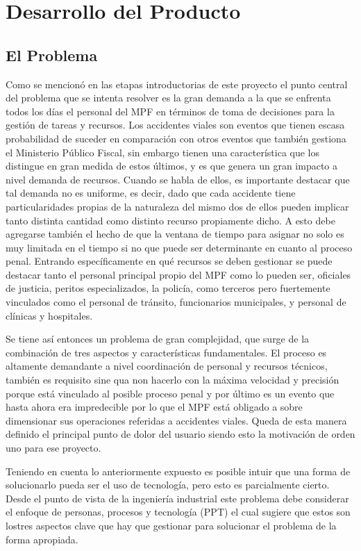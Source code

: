 \chapter{Desarrollo del Producto}\label{desarrollo-del-producto}

\section{El Problema}\label{el-problema}

Como se mencionó en las etapas introductorias de este proyecto el punto central del problema que se intenta resolver es la gran demanda a la que se enfrenta todos los días el personal del MPF en términos de toma de decisiones para la gestión de tareas y recursos. Los accidentes viales son eventos que tienen escasa probabilidad de suceder en comparación con otros eventos que también gestiona el Ministerio Público Fiscal, sin embargo tienen una característica que los distingue en gran medida de estos últimos, y es que genera un gran impacto a nivel demanda de recursos. Cuando se habla de ellos, es importante destacar que tal demanda no es uniforme, es decir, dado que cada accidente tiene particularidades propias de la naturaleza del mismo dos de ellos pueden implicar tanto distinta cantidad como distinto recurso propiamente dicho. A esto debe agregarse también el hecho de que la ventana de tiempo para asignar no solo es muy limitada en el tiempo si no que puede ser determinante en cuanto al proceso penal. Entrando específicamente en qué recursos se deben gestionar se puede destacar tanto el personal principal propio del MPF como lo pueden ser, oficiales de justicia, peritos especializados, la policía, como terceros pero fuertemente vinculados como el personal de tránsito, funcionarios municipales, y personal de clínicas y hospitales.

Se tiene así entonces un problema de gran complejidad, que surge de la combinación de tres aspectos y características fundamentales. El proceso es altamente demandante a nivel coordinación de personal y recursos técnicos, también es requisito sine qua non hacerlo con la máxima velocidad y precisión porque está vinculado al posible proceso penal y por último es un evento que hasta ahora era impredecible por lo que el MPF está obligado a sobre dimensionar sus operaciones referidas a accidentes viales. Queda de esta manera definido el principal punto de dolor del usuario siendo esto la motivación de orden uno para ese proyecto.

Teniendo en cuenta lo anteriormente expuesto es posible intuir que una forma de solucionarlo pueda ser el uso de tecnología, pero esto es parcialmente cierto. Desde el punto de vista de la ingeniería industrial este problema debe considerar el enfoque de personas, procesos y tecnología (PPT) el cual sugiere que estos son lostres aspectos clave que hay que gestionar para solucionar el problema de la forma apropiada.

